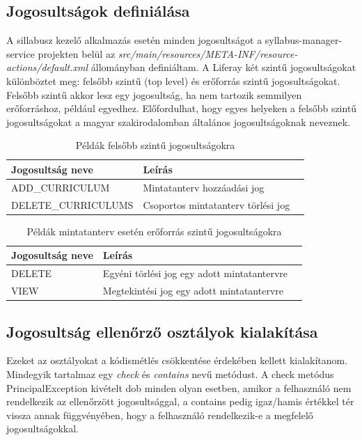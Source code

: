 \documentclass[hidelinks, 12pt, a4paper]{report}
\begin{document}
\subsection{Jogosultságok definiálása}

A sillabusz kezelő alkalmazás esetén minden jogosultságot a syllabus-manager-service projekten belül az \emph{src/main/resources/META-INF/resource-actions/default.xml} állományban definiáltam. A Liferay két szintű jogosultságokat különböztet meg: felsőbb szintű (top level) és erőforrás szintű jogosultságokat. Felsőbb szintű akkor lesz egy jogosultság, ha nem tartozik semmilyen erőforráshoz, például egyedhez. Előfordulhat, hogy egyes helyeken a felsőbb szintű jogosultságokat a magyar szakirodalomban általános jogosultságoknak neveznek.

\begin{table}[H]
	\caption{Példák felsőbb szintű jogosultságokra}
	\centering
	\begin{tabular}{| l | l | l |}
	\hline
	\textbf{Jogosultság neve} & \textbf{Leírás} \\
	\hline
	ADD\_CURRICULUM & Mintatanterv hozzáadási jog \\
	\hline
	DELETE\_CURRICULUMS & Csoportos mintatanterv törlési jog \\
	\hline
\end{tabular}
\end{table}

\begin{table}[H]
	\caption{Példák mintatanterv esetén erőforrás szintű jogosultságokra}
	\centering
	\begin{tabular}{| l | l | l |}
	\hline
	\textbf{Jogosultság neve} & \textbf{Leírás} \\
	\hline
	DELETE & Egyéni törlési jog egy adott mintatantervre \\
	\hline
	VIEW & Megtekintési jog egy adott mintatantervre \\
	\hline
\end{tabular}
\end{table}

\subsection{Jogosultság ellenőrző osztályok kialakítása}

Ezeket az osztályokat a kódismétlés csökkentése érdekében kellett kialakítanom. Mindegyik tartalmaz egy \emph{check} és \emph{contains} nevű metódust. A check metódus PrincipalException kivételt dob minden olyan esetben, amikor a felhasználó nem rendelkezik az ellenőrzött jogosultsággal, a contains pedig igaz/hamis értékkel tér vissza annak függvényében, hogy a felhasználó rendelkezik-e a megfelelő jogosultságokkal.
\end{document}
